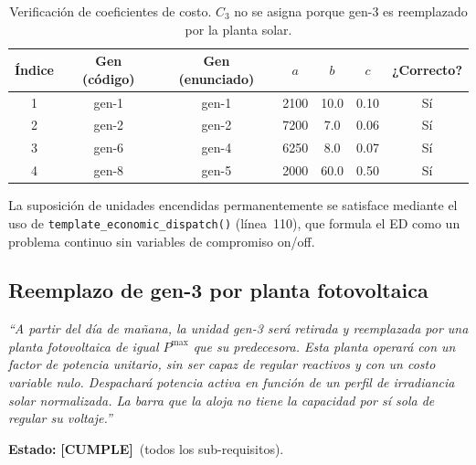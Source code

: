 \documentclass[12pt, a4paper]{article}
\newcommand{\cumple}{\textcolor{okgreen}{\textbf{[CUMPLE]}}}
\begin{document}
\begin{table}[h!]
\centering
\begin{tabular}{ccccccc}
\toprule
Índice & Gen (código) & Gen (enunciado) & $a$ & $b$ & $c$ & ¿Correcto? \\
\midrule
1 & gen-1 & gen-1 & 2100 & 10.0 & 0.10 & \textcolor{okgreen}{Sí} \\
2 & gen-2 & gen-2 & 7200 &  7.0 & 0.06 & \textcolor{okgreen}{Sí} \\
3 & gen-6 & gen-4 & 6250 &  8.0 & 0.07 & \textcolor{okgreen}{Sí} \\
4 & gen-8 & gen-5 & 2000 & 60.0 & 0.50 & \textcolor{okgreen}{Sí} \\
\bottomrule
\end{tabular}
\caption{Verificación de coeficientes de costo. $C_3$ no se asigna porque
gen-3 es reemplazado por la planta solar.}
\end{table}

La suposición de unidades encendidas permanentemente se satisface mediante el
uso de \texttt{template\_economic\_dispatch()} (línea~110), que formula el ED
como un problema continuo sin variables de compromiso on/off.

\subsection{Reemplazo de gen-3 por planta fotovoltaica}

\begin{enunciadobox}
\textit{``A partir del día de mañana, la unidad gen-3 será retirada y reemplazada
por una planta fotovoltaica de igual $P^\text{max}$ que su predecesora. Esta planta
operará con un factor de potencia unitario, sin ser capaz de regular reactivos y
con un costo variable nulo. Despachará potencia activa en función de un perfil de
irradiancia solar normalizada. La barra que la aloja no tiene la capacidad por sí
sola de regular su voltaje.''}
\end{enunciadobox}

\textbf{Estado:} \cumple\ (todos los sub-requisitos).
\end{document}
